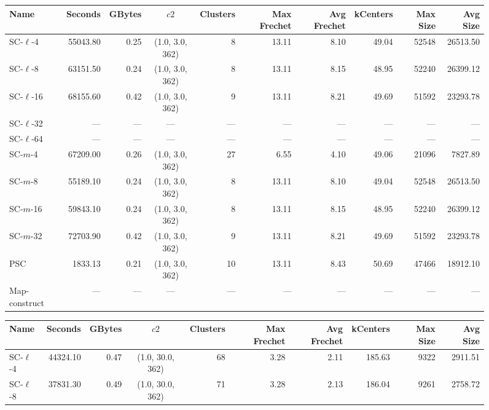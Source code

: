 \documentclass[11pt]{article}
\begin{document}
\clearpage
\newpage 
%
\clearpage
\begin{figure} \begin{center}
    \begin{minipage}{\textwidth}
{
\begin{tabular}{@{}lrrcrrrrrr@{}}
    \toprule
    Name & Seconds & GBytes & $c2$ & Clusters & Max Frechet & Avg Frechet & kCenters & Max Size & Avg Size\\
    \midrule
    SC-$\ell$-4 & 55043.80 & 0.25 & (1.0, 3.0, 362) & 8 & 13.11 & 8.10 & 49.04 & 52548 & 26513.50\\
    SC-$\ell$-8 & 63151.50 & 0.24 & (1.0, 3.0, 362) & 8 & 13.11 & 8.15 & 48.95 & 52240 & 26399.12\\
    SC-$\ell$-16 & 68155.60 & 0.42 & (1.0, 3.0, 362) & 9 & 13.11 & 8.21 & 49.69 & 51592 & 23293.78\\
    SC-$\ell$-32 & --- & --- & --- & --- & --- & --- & --- & --- & ---\\
    SC-$\ell$-64 & --- & --- & --- & --- & --- & --- & --- & --- & ---\\
    SC-$m$-4 & 67209.00 & 0.26 & (1.0, 3.0, 362) & 27 & 6.55 & 4.10 & 49.06 & 21096 & 7827.89\\
    SC-$m$-8 & 55189.10 & 0.24 & (1.0, 3.0, 362) & 8 & 13.11 & 8.10 & 49.04 & 52548 & 26513.50\\
    SC-$m$-16 & 59843.10 & 0.24 & (1.0, 3.0, 362) & 8 & 13.11 & 8.15 & 48.95 & 52240 & 26399.12\\
    SC-$m$-32 & 72703.90 & 0.42 & (1.0, 3.0, 362) & 9 & 13.11 & 8.21 & 49.69 & 51592 & 23293.78\\
    PSC & 1833.13 & 0.21 & (1.0, 3.0, 362) & 10 & 13.11 & 8.43 & 50.69 & 47466 & 18912.10\\
    Map-construct & --- & --- & --- & --- & --- & --- & --- & --- & ---\\
    \bottomrule
\end{tabular}
}
{
\begin{tabular}{@{}lrrcrrrrrr@{}}
    \toprule
    Name & Seconds & GBytes & $c2$ & Clusters & Max Frechet & Avg Frechet & kCenters & Max Size & Avg Size\\
    \midrule
    SC-$\ell$-4 & 44324.10 & 0.47 & (1.0, 30.0, 362) & 68 & 3.28 & 2.11 & 185.63 & 9322 & 2911.51\\
    SC-$\ell$-8 & 37831.30 & 0.49 & (1.0, 30.0, 362) & 71 & 3.28 & 2.13 & 186.04 & 9261 & 2758.72\\

\end{tabular}}
\end{minipage}
\end{center}
\end{figure}
\end{document}
